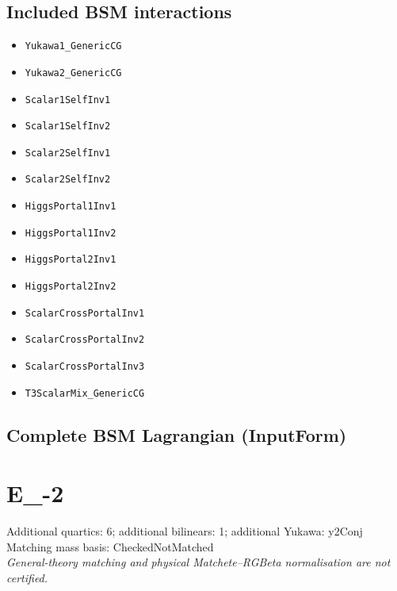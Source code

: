 \documentclass[10pt,a4paper]{article}
\begin{document}
\subsection*{Included BSM interactions}
\begin{itemize}
\item \texttt{Yukawa1\_GenericCG}
\item \texttt{Yukawa2\_GenericCG}
\item \texttt{Scalar1SelfInv1}
\item \texttt{Scalar1SelfInv2}
\item \texttt{Scalar2SelfInv1}
\item \texttt{Scalar2SelfInv2}
\item \texttt{HiggsPortal1Inv1}
\item \texttt{HiggsPortal1Inv2}
\item \texttt{HiggsPortal2Inv1}
\item \texttt{HiggsPortal2Inv2}
\item \texttt{ScalarCrossPortalInv1}
\item \texttt{ScalarCrossPortalInv2}
\item \texttt{ScalarCrossPortalInv3}
\item \texttt{T3ScalarMix\_GenericCG}
\end{itemize}
\subsection*{Complete BSM Lagrangian (InputForm)}

\clearpage
\section{E\_-2}
Additional quartics: 6; additional bilinears: 1; additional Yukawa: y2Conj\\
Matching mass basis: CheckedNotMatched\\
\emph{General-theory matching and physical Matchete--RGBeta normalisation are not certified.}
\end{document}
